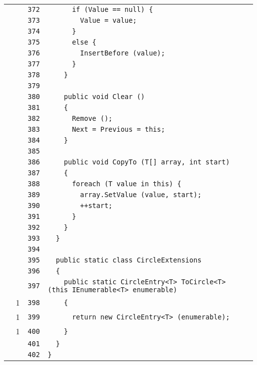 \documentclass[a4paper,10pt]{article}
\begin{document}
\begin{longtable}[l]{lrrl}
\cellcolor{gray} &  & \verb~372~ & \verb~      if (Value == null) {~\\
\cellcolor{gray} &  & \verb~373~ & \verb~        Value = value;~\\
\cellcolor{gray} &  & \verb~374~ & \verb~      }~\\
\cellcolor{gray} &  & \verb~375~ & \verb~      else {~\\
\cellcolor{gray} &  & \verb~376~ & \verb~        InsertBefore (value);~\\
\cellcolor{gray} &  & \verb~377~ & \verb~      }~\\
\cellcolor{gray} &  & \verb~378~ & \verb~    }~\\
\cellcolor{gray} &  & \verb~379~ & \verb~~\\
\cellcolor{gray} &  & \verb~380~ & \verb~    public void Clear ()~\\
\cellcolor{gray} &  & \verb~381~ & \verb~    {~\\
\cellcolor{gray} &  & \verb~382~ & \verb~      Remove ();~\\
\cellcolor{gray} &  & \verb~383~ & \verb~      Next = Previous = this;~\\
\cellcolor{gray} &  & \verb~384~ & \verb~    }~\\
\cellcolor{gray} &  & \verb~385~ & \verb~~\\
\cellcolor{gray} &  & \verb~386~ & \verb~    public void CopyTo (T[] array, int start)~\\
\cellcolor{gray} &  & \verb~387~ & \verb~    {~\\
\cellcolor{gray} &  & \verb~388~ & \verb~      foreach (T value in this) {~\\
\cellcolor{gray} &  & \verb~389~ & \verb~        array.SetValue (value, start);~\\
\cellcolor{gray} &  & \verb~390~ & \verb~        ++start;~\\
\cellcolor{gray} &  & \verb~391~ & \verb~      }~\\
\cellcolor{gray} &  & \verb~392~ & \verb~    }~\\
\cellcolor{gray} &  & \verb~393~ & \verb~  }~\\
\cellcolor{gray} &  & \verb~394~ & \verb~~\\
\cellcolor{gray} &  & \verb~395~ & \verb~  public static class CircleExtensions~\\
\cellcolor{gray} &  & \verb~396~ & \verb~  {~\\
\cellcolor{gray} &  & \verb~397~ & \verb~    public static CircleEntry<T> ToCircle<T> (this IEnumerable<T> enumerable)~\\
\cellcolor{green} & 1 & \verb~398~ & \verb~    {~\\
\cellcolor{green} & 1 & \verb~399~ & \verb~      return new CircleEntry<T> (enumerable);~\\
\cellcolor{green} & 1 & \verb~400~ & \verb~    }~\\
\cellcolor{gray} &  & \verb~401~ & \verb~  }~\\
\cellcolor{gray} &  & \verb~402~ & \verb~}~\\
\end{longtable}
\newpage
\end{document}
